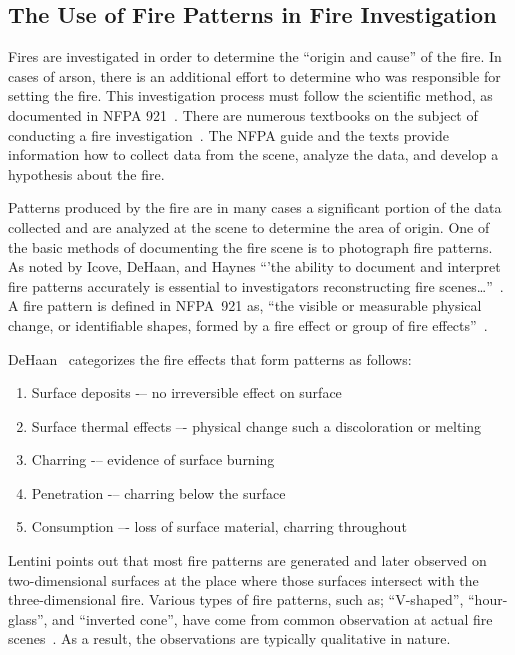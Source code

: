 \documentclass[twoside]{uocthesis}
\begin{document}
\subsection{The Use of Fire Patterns in Fire Investigation}
Fires are investigated in order to determine the ``origin and cause'' of the fire.  In cases of arson, there is an additional effort to determine who was responsible for setting the fire.  This investigation process must follow the scientific method, as documented in NFPA 921~\cite{NFPA:921}.  There are numerous textbooks on the subject of conducting a fire investigation~\cite{Almirall:2004,Fire_Investigation,DeHaan:2012,Icove:2013,Lentini:2006,Noon:1995}. The NFPA guide and the texts provide information how to collect data from the scene, analyze the data, and develop a hypothesis about the fire.

Patterns produced by the fire are in many cases a significant portion of the data collected and are analyzed at the scene to determine the area of origin.  One of the basic methods of documenting the fire scene is to photograph fire patterns.  As noted by Icove, DeHaan, and Haynes  ``'the ability to document and interpret fire patterns accurately is essential to investigators reconstructing fire scenes…''~\cite{Icove:2013}.  A fire pattern is defined in NFPA~921 as, ``the visible or measurable physical change, or identifiable shapes, formed by a fire effect or group of fire effects''~\cite{NFPA:921}.

DeHaan~\cite{DeHaan:2012} categorizes the fire effects that form patterns as follows:
\begin{enumerate}
\item Surface deposits -– no irreversible effect on surface
\item Surface thermal effects –- physical change such a discoloration or melting
\item Charring -– evidence of surface burning
\item Penetration -– charring below the surface
\item Consumption –- loss of surface material, charring throughout
\end{enumerate}
Lentini points out that most fire patterns are generated and later observed on two-dimensional surfaces at the place where those surfaces intersect with the three-dimensional fire. Various types of fire patterns, such as; ``V-shaped'', ``hour-glass'', and ``inverted cone'', have come from common observation at actual fire scenes~\cite{Lentini:2006}.  As a result, the observations are typically qualitative in nature.
\end{document}
